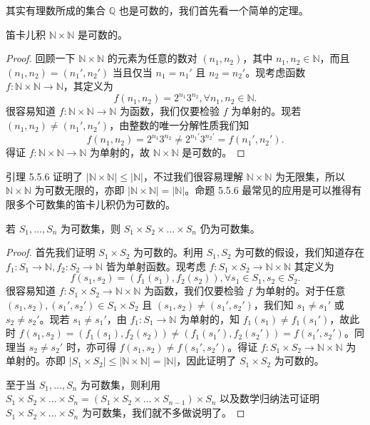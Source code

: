 其实有理数所成的集合 $\mathbb{Q}$ 也是可数的，我们首先看一个简单的定理。

\begin{lemma}
笛卡儿积 $\mathbb{N} \times \mathbb{N}$ 是可数的。
\end{lemma}

\begin{proof}
回顾一下 $\mathbb{N} \times \mathbb{N}$ 的元素为任意的数对 $(n_1, n_2)$，其中 $n_1, n_2 \in \mathbb{N}$，而且 $(n_1, n_2) = (n_1', n_2')$ 当且仅当 $n_1 = n_1'$ 且 $n_2 = n_2'$。现考虑函数 $f : \mathbb{N} \times \mathbb{N} \to \mathbb{N}$，其定义为
$$ f(n_1, n_2) = 2^{n_1} 3^{n_2}, \forall n_1, n_2 \in \mathbb{N}. $$
很容易知道 $f : \mathbb{N} \times \mathbb{N} \to \mathbb{N}$ 为函数，我们仅要检验 $f$ 为单射的。现若 $(n_1, n_2) \neq (n_1', n_2')$，由整数的唯一分解性质我们知
$$ f(n_1, n_2) = 2^{n_1} 3^{n_2} \neq 2^{n_1'} 3^{n_2'} = f(n_1', n_2'). $$
得证 $f : \mathbb{N} \times \mathbb{N} \to \mathbb{N}$ 为单射的，故 $\mathbb{N} \times \mathbb{N}$ 是可数的。
\end{proof}

引理 5.5.6 证明了 $|\mathbb{N} \times \mathbb{N}| \leq |\mathbb{N}|$，不过我们很容易理解 $\mathbb{N} \times \mathbb{N}$ 为无限集，所以 $\mathbb{N} \times \mathbb{N}$ 为可数无限的，亦即 $|\mathbb{N} \times \mathbb{N}| = |\mathbb{N}|$。命题 5.5.6 最常见的应用是可以推得有限多个可数集的笛卡儿积仍为可数的。

\begin{proposition}
若 $S_1, \dots, S_n$ 为可数集，则 $S_1 \times S_2 \times \dots \times S_n$ 仍为可数集。
\end{proposition}

\begin{proof}
首先我们证明 $S_1 \times S_2$ 为可数的。利用 $S_1, S_2$ 为可数的假设，我们知道存在 $f_1 : S_1 \to \mathbb{N}, f_2 : S_2 \to \mathbb{N}$ 皆为单射函数。现考虑 $f : S_1 \times S_2 \to \mathbb{N} \times \mathbb{N}$ 其定义为
$$ f(s_1, s_2) = (f_1(s_1), f_2(s_2)), \forall s_1 \in S_1, s_2 \in S_2. $$
很容易知道 $f : S_1 \times S_2 \to \mathbb{N} \times \mathbb{N}$ 为函数，我们仅要检验 $f$ 为单射的。对于任意 $(s_1, s_2), (s_1', s_2') \in S_1 \times S_2$ 且 $(s_1, s_2) \neq (s_1', s_2')$，我们知 $s_1 \neq s_1'$ 或 $s_2 \neq s_2'$。现若 $s_1 \neq s_1'$，由 $f_1 : S_1 \to \mathbb{N}$ 为单射的，知 $f_1(s_1) \neq f_1(s_1')$，故此时 $f(s_1, s_2) = (f_1(s_1), f_2(s_2)) \neq (f_1(s_1'), f_2(s_2')) = f(s_1', s_2')$。同理当 $s_2 \neq s_2'$ 时，亦可得 $f(s_1, s_2) \neq f(s_1', s_2')$。得证 $f : S_1 \times S_2 \to \mathbb{N} \times \mathbb{N}$ 为单射的。亦即 $|S_1 \times S_2| \leq |\mathbb{N} \times \mathbb{N}| = |\mathbb{N}|$，因此证明了 $S_1 \times S_2$ 为可数的。

至于当 $S_1, \dots, S_n$ 为可数集，则利用 $S_1 \times S_2 \times \dots \times S_n = (S_1 \times S_2 \times \dots \times S_{n-1}) \times S_n$ 以及数学归纳法可证明 $S_1 \times S_2 \times \dots \times S_n$ 为可数集，我们就不多做说明了。
\end{proof}

